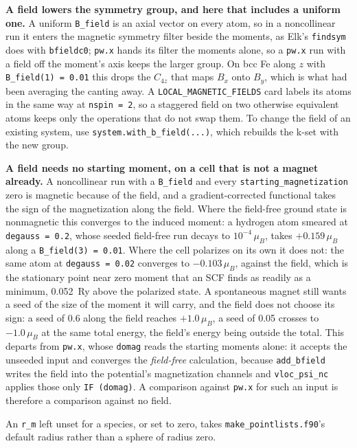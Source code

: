 \documentclass[11pt,a4paper]{article}
\newcommand{\code}[1]{\texttt{\small #1}}
\begin{document}
\textbf{A field lowers the symmetry group, and here that includes a uniform
one.} A uniform \code{B\_field} is an axial vector on every atom, so in a
noncollinear run it enters the magnetic symmetry filter beside the moments, as
Elk's \code{findsym} does with \code{bfieldc0}; \code{pw.x} hands its filter
the moments alone, so a \code{pw.x} run with a field off the moment's axis keeps
the larger group. On bcc Fe along $z$ with \code{B\_field(1) = 0.01} this drops
the $C_{4z}$ that maps $B_x$ onto $B_y$, which is what had been averaging the
canting away. A \code{LOCAL\_MAGNETIC\_FIELDS} card labels its atoms in the
same way at \code{nspin = 2}, so a staggered field on two otherwise equivalent
atoms keeps only the operations that do not swap them. To change the field of
an existing system, use \code{system.with\_b\_field(...)}, which rebuilds the
k-set with the new group.

\textbf{A field needs no starting moment, on a cell that is not a magnet
already.} A noncollinear run with a \code{B\_field} and every
\code{starting\_magnetization} zero is magnetic because of the field, and a
gradient-corrected functional takes the sign of the magnetization along the
field. Where the field-free ground state is nonmagnetic this converges to the
induced moment: a hydrogen atom smeared at \code{degauss = 0.2}, whose seeded
field-free run decays to $10^{-4}\,\mu_B$, takes $+0.159\,\mu_B$ along a
\code{B\_field(3) = 0.01}. Where the cell polarizes on its own it does not: the
same atom at \code{degauss = 0.02} converges to $-0.103\,\mu_B$, against the
field, which is the stationary point near zero moment that an SCF finds as
readily as a minimum, 0.052~Ry above the polarized state. A spontaneous magnet
still wants a seed of the size of the moment it will carry, and the field does
not choose its sign: a seed of 0.6 along the field reaches $+1.0\,\mu_B$, a seed
of 0.05 crosses to $-1.0\,\mu_B$ at the same total energy, the field's energy
being outside the total. This departs from \code{pw.x}, whose \code{domag} reads
the starting moments alone: it accepts the unseeded input and converges the
\emph{field-free} calculation, because \code{add\_bfield} writes the field into
the potential's magnetization channels and \code{vloc\_psi\_nc} applies those
only \code{IF (domag)}. A comparison against \code{pw.x} for such an input is
therefore a comparison against no field.

An \code{r\_m} left unset for a species, or set to
zero, takes \code{make\_pointlists.f90}'s default radius rather than a sphere of
radius zero.
\end{document}
